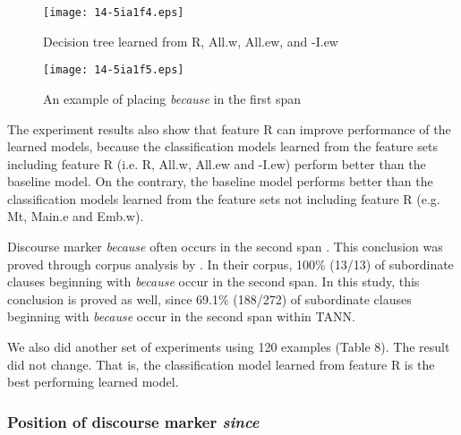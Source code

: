 \documentclass[english]{jnlp_1.3e}
\begin{document}
\begin{table}[t]

\end{table}
\begin{figure}[t]
\begin{center}
\texttt{[image: 14-5ia1f4.eps]}
\end{center}
 \caption{Decision tree learned from R, All.w, All.ew, and -I.ew}
\end{figure}
\begin{figure}[t]
\begin{center}
\texttt{[image: 14-5ia1f5.eps]}
\end{center}
 \caption{An example of placing \textit{because} in the first span}
\end{figure}

The experiment results also show that feature R can improve performance
of the learned models, because the classification models learned
from the feature sets including feature R (i.e. R, All.w, All.ew and -I.ew) 
perform better than the baseline model. On the contrary, the baseline model
performs better than the classification models learned from the 
feature sets not including feature R (e.g. Mt, Main.e and Emb.w).  

Discourse marker \textit{because} often occurs in the second span \cite{Quirk72}.  
This conclusion was proved through corpus analysis by \cite{Moser95a}. In their corpus, 
100\% (13/13) of subordinate clauses beginning with \textit{because} occur 
in the second span. In this study, this conclusion is proved as well,
since 69.1\% (188/272) of subordinate clauses beginning with \textit{because} 
occur in the second span within TANN. 

We also did another set of experiments using 120 examples (Table 8). 
The result did not change. That is, the classification model learned from
feature R is the best performing learned model. 

\begin{table}[t]

\end{table}



\subsubsection{Position of discourse marker \textit{since}}
\end{document}
